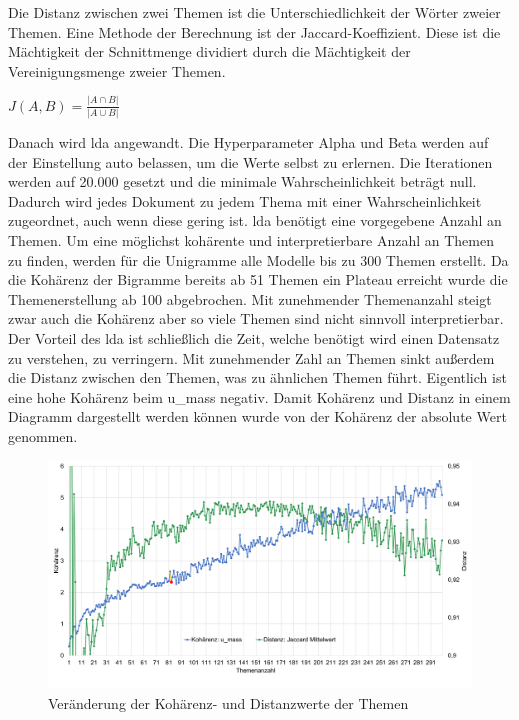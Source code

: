 Die Distanz zwischen zwei Themen ist die Unterschiedlichkeit der Wörter zweier Themen. Eine Methode der Berechnung ist der Jaccard-Koeffizient. Diese ist die Mächtigkeit der Schnittmenge dividiert durch die Mächtigkeit der Vereinigungsmenge zweier Themen.


\begin{center}
	$J(A,B) = \frac{\left|A \cap B\right|}{\left|A \cup B\right|}$ 
\end{center}


Danach wird \ac{lda} angewandt. Die Hyperparameter Alpha und Beta werden auf der Einstellung auto belassen, um die Werte selbst zu erlernen. Die Iterationen werden auf 20.000 gesetzt und die minimale Wahrscheinlichkeit beträgt null. Dadurch wird jedes Dokument zu jedem Thema mit einer Wahrscheinlichkeit zugeordnet, auch wenn diese gering ist. \ac{lda} benötigt eine vorgegebene Anzahl an Themen. Um eine möglichst kohärente und interpretierbare Anzahl an Themen zu finden, werden für die Unigramme alle Modelle bis zu 300 Themen erstellt. Da die Kohärenz der Bigramme bereits ab 51 Themen ein Plateau erreicht wurde die Themenerstellung ab 100 abgebrochen. Mit zunehmender Themenanzahl steigt zwar auch die Kohärenz aber so viele Themen sind nicht sinnvoll interpretierbar. Der Vorteil des \ac{lda} ist schließlich die Zeit, welche benötigt wird einen Datensatz zu verstehen, zu verringern. Mit zunehmender Zahl an Themen sinkt außerdem die Distanz zwischen den Themen, was zu ähnlichen Themen führt. Eigentlich ist eine hohe Kohärenz beim u\_mass negativ. Damit Kohärenz und Distanz in einem Diagramm dargestellt werden können wurde von der Kohärenz der absolute Wert genommen.

\begin{landscape}
\begin{figure}[htpb]
	\centering
	\includegraphics[width=\textwidth,keepaspectratio=true]{img/coherenceAndDistanceUnigram.png}
	\caption{
		Veränderung der Kohärenz- und Distanzwerte der Themen
	}
	\label{fig:Kohärenz_Distanz_Unigramme}
\end{figure}
\end{landscape}


